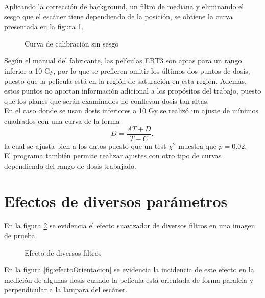 Aplicando la corrección de background, un filtro de mediana y eliminando el sesgo que el escáner tiene dependiendo de la posición, se obtiene la curva presentada en la figura \ref{fig:curvaFinal}.\\

\begin{figure}
	\centering
	
	\caption{Curva de calibración sin sesgo }
	\label{fig:curvaFinal}
\end{figure}

Según el manual del fabricante, las películas EBT3 son aptas para un rango inferior a 10 Gy, por lo que se prefieren omitir los últimos dos puntos de dosis, puesto que la película está en la región de saturación en esta región.  Además, estos puntos no aportan información adicional a los propósitos del trabajo, puesto que los planes que serán examinados no conllevan dosis tan altas.\\

En el caso donde se usan dosis inferiores a 10 Gy se realizó un ajuste de mínimos cuadrados con una curva de la forma
\begin{equation}
D=\frac{AT+D}{T-C},
\end{equation}
la cual se ajusta bien a los datos puesto que un test $\chi^2$ muestra que $p=0.02$. \\

El programa también permite realizar ajustes con otro tipo de curvas dependiendo del rango de dosis trabajado.\\


\section{Efectos de diversos parámetros}
 En la figura \ref{fig:filtros} se evidencia el efecto suavizador de diversos filtros en una imagen de prueba. \\
\begin{figure}
	\centering
	
	\caption{Efecto de diversos filtros}
	\label{fig:filtros}
\end{figure}


En la figura \ref{fig:efectoOrientacion} se evidencia la incidencia de este efecto en la  medición de algunas dosis cuando la película está orientada de forma paralela y perpendicular a la lampara del escáner. \\

